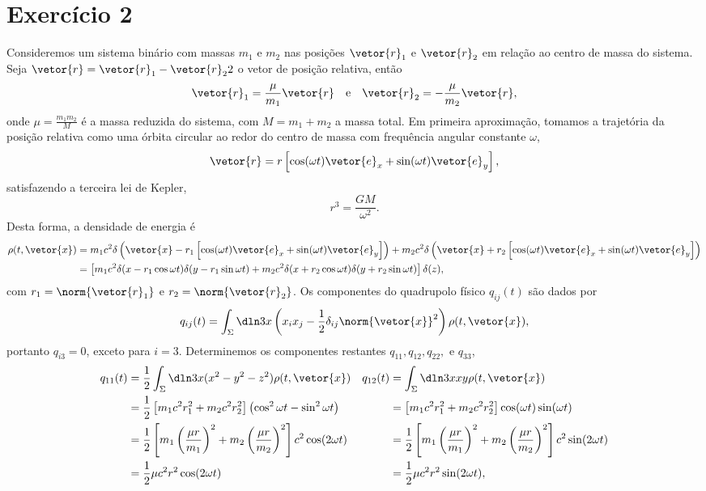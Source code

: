 \section*{Exercício 2}
Consideremos um sistema binário com massas \(m_1\) e \(m_2\) nas posições \(\vetor{r}_1\) e \(\vetor{r}_2\) em relação ao centro de massa do sistema. Seja \(\vetor{r} = \vetor{r}_1 - \vetor{r}_22\) o vetor de posição relativa, então
\begin{equation*}
    \vetor{r}_1 = \frac{\mu}{m_1}\vetor{r}\quad\text{e}\quad \vetor{r}_2 =-\frac{\mu}{m_2}\vetor{r},
\end{equation*}
onde \(\mu = \frac{m_1m_2}{M}\) é a massa reduzida do sistema, com \(M = m_1 + m_2\) a massa total. Em primeira aproximação, tomamos a trajetória da posição relativa como uma órbita circular ao redor do centro de massa com frequência angular constante \(\omega\),
\begin{equation*}
    \vetor{r} = r \left[\cos(\omega t) \vetor{e}_x + \sin(\omega t)\vetor{e}_y\right],
\end{equation*}
satisfazendo a terceira lei de Kepler,
\begin{equation*}
    r^3 = \frac{GM}{\omega^2}.
\end{equation*}
Desta forma, a densidade de energia é
\begin{align*}
    \rho(t, \vetor{x}) &= m_1c^2\delta\left(\vetor{x} - r_1\left[\cos(\omega t) \vetor{e}_x + \sin(\omega t)\vetor{e}_y\right]\right) + m_2c^2 \delta\left(\vetor{x} + r_2\left[\cos(\omega t) \vetor{e}_x + \sin(\omega t)\vetor{e}_y\right]\right)\\
                       &= \left[m_1c^2 \delta(x - r_1 \cos\omega t)\delta(y - r_1\sin\omega t) + m_2c^2 \delta(x + r_2 \cos\omega t)\delta(y + r_2 \sin\omega t)\right]\delta(z),
\end{align*}
com \(r_1 = \norm{\vetor{r}_1}\) e \(r_2 = \norm{\vetor{r}_2}\). Os componentes do quadrupolo físico \(q_{ij}(t)\) são dados por
\begin{equation*}
    q_{ij}(t) = \int_{\Sigma} \dln3x\left(x_ix_j - \frac12 \delta_{ij}\norm{\vetor{x}}^2\right)\rho(t, \vetor{x}),
\end{equation*}
portanto \(q_{i3} = 0\), exceto para \(i = 3\). Determinemos os componentes restantes \(q_{11}, q_{12}, q_{22},\) e \(q_{33}\),
\begin{align*}
    q_{11}(t) &= \frac12 \int_{\Sigma}\dln3x (x^2 - y^2 - z^2) \rho(t, \vetor{x})&
    q_{12}(t) &= \int_{\Sigma}\dln3x xy \rho(t, \vetor{x})\\
              &= \frac12\left[m_1c^2 r_1^2 + m_2 c^2r_2^2\right] \left(\cos^2\omega t - \sin^2 \omega t\right)&
              &= \left[m_1 c^2 r_1^2 + m_2 c^2 r_2^2\right] \cos(\omega t)\sin(\omega t)\\
              &= \frac12 \left[m_1 \left(\frac{\mu r}{m_1}\right)^2 + m_2\left(\frac{\mu r}{m_2}\right)^2\right] c^2\cos(2\omega t)&
              &= \frac12\left[m_1\left(\frac{\mu r}{m_1}\right)^2 + m_2\left(\frac{\mu r}{m_2}\right)^2\right]c^2\sin(2\omega t)\\
              &= \frac12 \mu c^2 r^2\cos(2\omega t)&
              &= \frac12 \mu c^2 r^2 \sin(2\omega t),
\end{align*}

